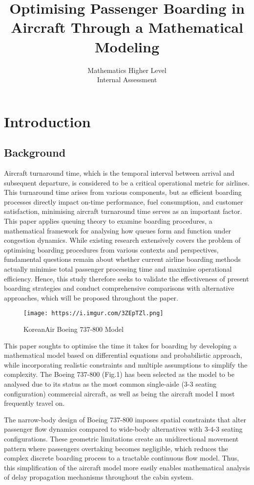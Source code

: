 \documentclass[12pt]{article}
\title{Optimising Passenger Boarding in Aircraft Through a Mathematical Modeling}
\author{Mathematics Higher Level\\Internal Assessment}
\date{}
\begin{document}
\maketitle
\thispagestyle{empty}
\newpage

\section{Introduction}
\subsection{Background}

Aircraft turnaround time, which is the temporal interval between arrival and subsequent departure, is considered to be a critical operational metric for airlines. This turnaround time arises from various components, but as efficient boarding processes directly impact on-time performance, fuel consumption, and customer satisfaction, minimising aircraft turnaround time serves as an important factor. This paper applies queuing theory to examine boarding procedures, a mathematical framework for analysing how queues form and function under congestion dynamics. While existing research extensively covers the problem of optimising boarding procedures from various contexts and perspectives, fundamental questions remain about whether current airline boarding methods actually minimise total passenger processing time and maximise operational efficiency. Hence, this study therefore seeks to validate the effectiveness of present boarding strategies and conduct comprehensive comparisons with alternative approaches, which will be proposed throughout the paper.

\begin{figure}[H]
\centering
\texttt{[image: https://i.imgur.com/3ZEpTZl.png]}
\caption{KoreanAir Boeing 737-800 Model}
\end{figure}

This paper soughts to optimise the time it takes for boarding by developing a mathematical model based on differential equations and probabilistic approach, while incorporating realistic constraints and multiple assumptions to simplify the complexity. The Boeing 737-800 (Fig.1) has been selected as the model to be analysed due to its status as the most common single-aisle (3-3 seating configuration) commercial aircraft, as well as being the aircraft model I most frequently travel on.

The narrow-body design of Boeing 737-800 imposes spatial constraints that alter passenger flow dynamics compared to wide-body alternatives with 3-4-3 seating configurations. These geometric limitations create an unidirectional movement pattern where passengers overtaking becomes negligible, which reduces the complex discrete boarding process to a tractable continuous flow model. Thus, this simplification of the aircraft model more easily enables mathematical analysis of delay propagation mechanisms throughout the cabin system.
\end{document}
